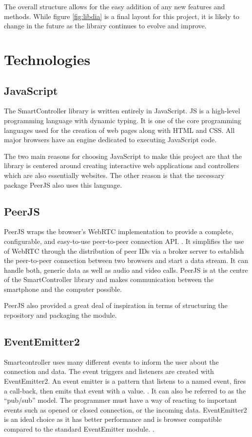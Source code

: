 \documentclass{l4proj}
\begin{document}
The overall structure allows for the easy addition of any new features and methods. While figure \ref{fig:libdia} is a final layout for this project, it is likely to change in the future as the library continues to evolve and improve.


\section{Technologies}

\subsection{JavaScript}
The SmartController library is written entirely in JavaScript. JS is a high-level programming language with dynamic typing. It is one of the core programming languages used for the creation of web pages along with HTML and CSS. All major browsers have an engine dedicated to executing JavaScript code. \cite{js} \par 
The two main reasons for choosing JavaScript to make this project are that the library is centered around creating interactive web applications and controllers which are also essentially websites. The other reason is that the necessary package PeerJS also uses this language.  

\subsection{PeerJS} 
PeerJS wraps the browser's WebRTC implementation to provide a complete, configurable, and easy-to-use peer-to-peer connection API. \cite{peerjs}. It simplifies the use of WebRTC through the distribution of peer IDs via a broker server to establish the peer-to-peer connection between two browsers and start a data stream. It can handle both, generic data as well as audio and video calls. PeerJS is at the centre of the SmartController library and makes communication between the smartphone and the computer possible. \par
PeerJS also provided a great deal of inspiration in terms of structuring the repository and packaging the module. 



\subsection{EventEmitter2}
Smartcontroller uses many different events to inform the user about the connection and data. The event triggers and listeners are created with EventEmitter2. An event emitter is a pattern that listens to a named event, fires a call-back, then emits that event with a value. \cite{event}. It can also be referred to as the “pub/sub” model. The programmer must have a way of reacting to important events such as opened or closed connection, or the incoming data. EventEmitter2 is an ideal choice as it has better performance and is browser compatible compared to the standard EventEmitter module. \cite{event2}.
\end{document}
